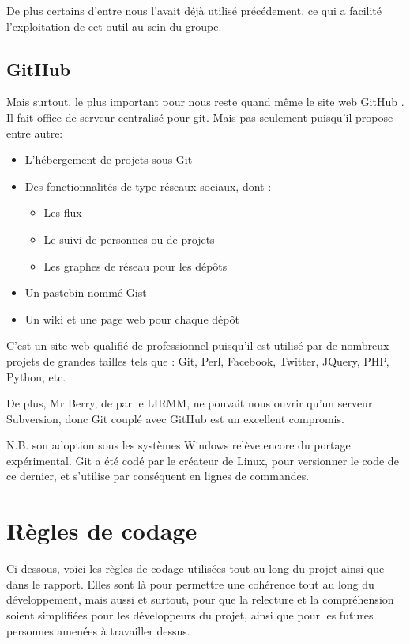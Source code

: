     De plus certains d'entre nous l'avait déjà utilisé précédement, ce qui a facilité
    l'exploitation de cet outil au sein du groupe.
\newpage

        \subsection{GitHub}
    Mais surtout, le plus important pour nous reste quand même le site web GitHub \cite{github}.
    Il fait office de serveur centralisé pour git. Mais pas seulement puisqu'il 
    propose entre autre:

    \begin{itemize}
    \item L'hébergement de projets sous Git
    \item Des fonctionnalités de type réseaux sociaux, dont :
        \begin{itemize}
        \item Les flux
        \item Le suivi de personnes ou de projets
        \item Les graphes de réseau pour les dépôts
        \end{itemize}
    \item Un pastebin nommé Gist
    \item Un wiki et une page web pour chaque dépôt
    \end{itemize}

C'est un site web qualifié de professionnel puisqu'il est utilisé par de 
nombreux projets de grandes tailles tels que : Git, Perl, Facebook, Twitter,
JQuery, PHP, Python, etc.

De plus, Mr Berry, de par le LIRMM, ne pouvait nous ouvrir qu'un serveur
Subversion, donc Git couplé avec GitHub est un excellent compromis.

N.B. son adoption sous les systèmes Windows relève encore du portage
expérimental. Git a été codé par le créateur de Linux, pour versionner le code
de ce dernier, et s'utilise par conséquent en lignes de commandes.

    \section{Règles de codage}

Ci-dessous, voici les règles de codage utilisées tout au long du projet
ainsi que dans le rapport. Elles sont là pour permettre une cohérence tout au
long du développement, mais aussi et surtout, pour que la relecture et la 
compréhension soient simplifiées pour les développeurs du projet, ainsi que pour les
futures personnes amenées à travailler dessus.

